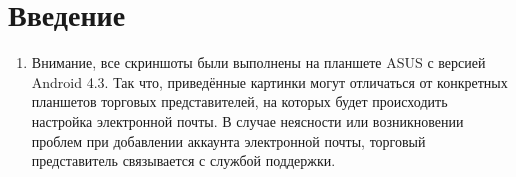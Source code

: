 \section{Введение}
\begin{enumerate}[\thesection .1]
\item Внимание, все скриншоты были выполнены на планшете ASUS с версией Android 4.3. Так что, приведённые картинки могут отличаться  от конкретных планшетов торговых представителей, на которых будет происходить настройка электронной почты. В случае неясности или возникновении проблем при добавлении аккаунта электронной почты, торговый представитель связывается с службой поддержки.
\end{enumerate}